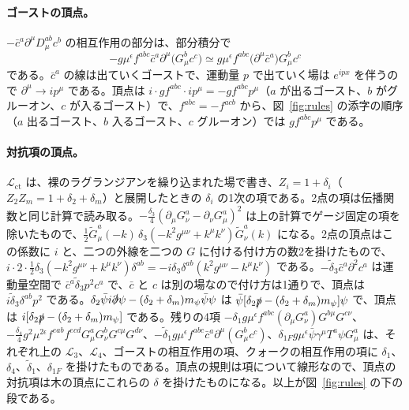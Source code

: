 \documentclass[a4paper,10pt]{ltjsarticle}
\begin{document}
\paragraph{ゴーストの頂点。}$-\bar c^a\partial^\mu D_\mu^{ab}c^b$ の相互作用の部分は、部分積分で
\begin{equation*}
-g\mu^\epsilon f^{abc}\bar c^a\partial^\mu\bigl(G^b_\mu c^c\bigr)\simeq g\mu^\epsilon f^{abc}\bigl(\partial^\mu\bar c^a\bigr)G^b_\mu c^c
\end{equation*}
である。$\bar c^a$ の線は出ていくゴーストで、運動量 $p$ で出ていく場は $e^{ipx}$ を伴うので $\partial^\mu\to ip^\mu$ である。頂点は $i\cdot g f^{abc}\cdot ip^\mu=-gf^{abc}p^\mu$（$a$ が出るゴースト、$b$ がグルーオン、$c$ が入るゴースト）で、$f^{abc}=-f^{acb}$ から、図~\ref{fig:rules} の添字の順序（$a$ 出るゴースト、$b$ 入るゴースト、$c$ グルーオン）では $gf^{abc}p^\mu$ である。

\paragraph{対抗項の頂点。}$\mathcal L_{\mathrm{ct}}$ は、裸のラグランジアンを繰り込まれた場で書き、$Z_i=1+\delta_i$（$Z_2Z_m=1+\delta_2+\delta_m$）と展開したときの $\delta_i$ の1次の項である。2点の項は伝播関数と同じ計算で読み取る。$-\frac{\delta_3}4(\partial_\mu G^a_\nu-\partial_\nu G^a_\mu)^2$ は上の計算でゲージ固定の項を除いたもので、$\frac12\tilde G^a_\mu(-k)\,\delta_3(-k^2g^{\mu\nu}+k^\mu k^\nu)\tilde G^a_\nu(k)$ になる。2点の頂点はこの係数に $i$ と、二つの外線を二つの $G$ に付ける付け方の数2を掛けたもので、$i\cdot2\cdot\frac12\delta_3(-k^2g^{\mu\nu}+k^\mu k^\nu)\delta^{ab}=-i\delta_3\delta^{ab}(k^2g^{\mu\nu}-k^\mu k^\nu)$ である。$-\tilde\delta_3\bar c^a\partial^2c^a$ は運動量空間で $\bar c^a\tilde\delta_3p^2c^a$ で、$\bar c$ と $c$ は別の場なので付け方は1通りで、頂点は $i\tilde\delta_3\delta^{ab}p^2$ である。$\delta_2\bar\psi i\slashed\partial\psi-(\delta_2+\delta_m)m_\psi\bar\psi\psi$ は $\bar\psi[\delta_2\slashed p-(\delta_2+\delta_m)m_\psi]\psi$ で、頂点は $i[\delta_2\slashed p-(\delta_2+\delta_m)m_\psi]$ である。残りの4項 $-\delta_1g\mu^\epsilon f^{abc}(\partial_\mu G^a_\nu)G^{b\mu}G^{c\nu}$、$-\frac{\delta_4}4g^2\mu^{2\epsilon}f^{eab}f^{ecd}G^a_\mu G^b_\nu G^{c\mu}G^{d\nu}$、$-\tilde\delta_1g\mu^\epsilon f^{abc}\bar c^a\partial^\mu(G^b_\mu c^c)$、$\delta_{1F}g\mu^\epsilon\bar\psi\gamma^\mu T^a\psi G^a_\mu$ は、それぞれ上の $\mathcal L_3$、$\mathcal L_4$、ゴーストの相互作用の項、クォークの相互作用の項に $\delta_1$、$\delta_4$、$\tilde\delta_1$、$\delta_{1F}$ を掛けたものである。頂点の規則は項について線形なので、頂点の対抗項は木の頂点にこれらの $\delta$ を掛けたものになる。以上が図~\ref{fig:rules} の下の段である。
\end{document}
